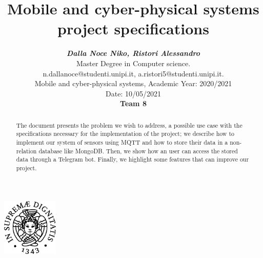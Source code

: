 \documentclass[12pt, letterpaper]{article}  %
\title{\vspace{-2cm}\textbf{Mobile and cyber-physical systems project specifications}}
\author{\textbf{\small{\textit{Dalla Noce Niko, Ristori Alessandro}}} \\ %
        \small{Master Degree in Computer science.}\\ \small{{n.dallanoce@studenti.unipi.it, a.ristori5@studenti.unipi.it}.} \\  %
        \small{Mobile and cyber-physical systems, Academic Year: 2020/2021} \\
        \small{Date: 10/05/2021} \\
       \textbf{ \small{Team 8}}
}
\begin{document}
\nocite{*}  %
\date{}
\maketitle
\begin{center}
    \includegraphics[width=0.2\textwidth]{images/unipi.png}\\
    \vspace{0.5cm}
\end{center}
\begin{abstract}
The document presents the problem we wish to address, a possible use case with the specifications necessary for the implementation of the project; we describe how to implement our system of sensors using MQTT and how to store their data in a non-relation database like MongoDB. Then, we show how an user can access the stored data through a Telegram bot. Finally, we highlight some features that can improve our project.
\end{abstract}
%
\newpage
\tableofcontents

%
%
%

\end{document}
